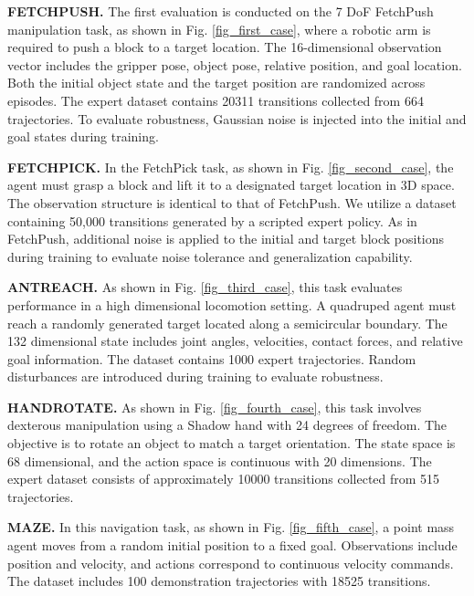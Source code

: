 \documentclass[journal]{IEEEtran}
\begin{document}
\textbf{FETCHPUSH.} The first evaluation is conducted on the 7 DoF FetchPush manipulation task, as shown in Fig. \ref{fig_first_case}, where a robotic arm is required to push a block to a target location. The 16-dimensional observation vector includes the gripper pose, object pose, relative position, and goal location. Both the initial object state and the target position are randomized across episodes. The expert dataset contains 20311 transitions collected from 664 trajectories\cite{lee2021generalizable}. To evaluate robustness, Gaussian noise is injected into the initial and goal states during training.

\textbf{FETCHPICK.} In the FetchPick task, as shown in Fig. \ref{fig_second_case}, the agent must grasp a block and lift it to a designated target location in 3D space. The observation structure is identical to that of FetchPush. We utilize a dataset containing 50,000 transitions generated by a scripted expert policy\cite{lee2021generalizable}. As in FetchPush, additional noise is applied to the initial and target block positions during training to evaluate noise tolerance and generalization capability.



\textbf{ANTREACH.} As shown in Fig. \ref{fig_third_case}, this task evaluates performance in a high dimensional locomotion setting. A quadruped agent must reach a randomly generated target located along a semicircular boundary. The 132 dimensional state includes joint angles, velocities, contact forces, and relative goal information. The dataset contains 1000 expert trajectories\cite{lee2021generalizable}. Random disturbances are introduced during training to evaluate robustness.

\textbf{HANDROTATE.} As shown in Fig. \ref{fig_fourth_case}, this task involves dexterous manipulation using a Shadow hand with 24 degrees of freedom. The objective is to rotate an object to match a target orientation. The state space is 68 dimensional, and the action space is continuous with 20 dimensions. The expert dataset consists of approximately 10000 transitions collected from 515 trajectories\cite{lee2021generalizable}.

\textbf{MAZE.} In this navigation task, as shown in Fig. \ref{fig_fifth_case}, a point mass agent moves from a random initial position to a fixed goal. Observations include position and velocity, and actions correspond to continuous velocity commands. The dataset includes 100 demonstration trajectories with 18525 transitions\cite{lee2021generalizable}.
\end{document}
